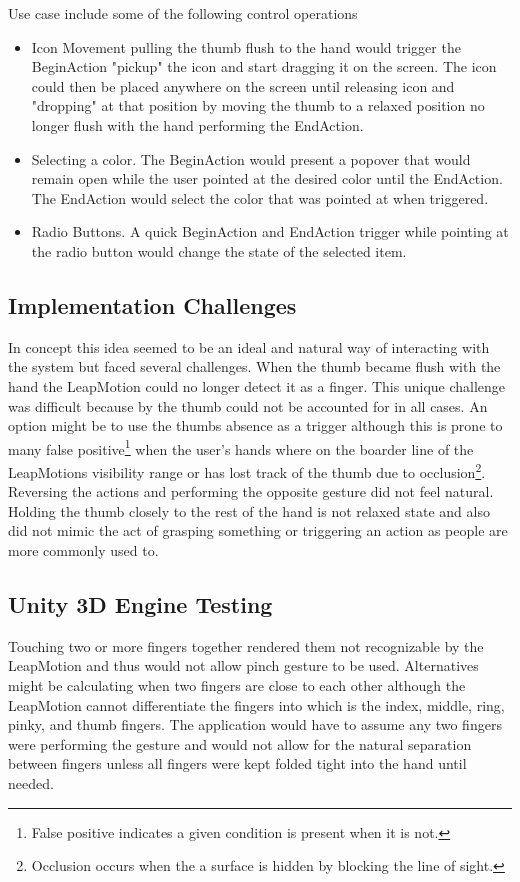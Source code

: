 Use case include some of the following control operations

\begin{itemize}
\item Icon Movement pulling the thumb flush to the hand would trigger the BeginAction "pickup" the icon and start dragging it on the screen. The icon could then be placed anywhere on the screen until releasing icon and "dropping" at that position by moving the thumb to a relaxed position no longer flush with the hand performing the EndAction.
\item Selecting a color. The BeginAction would present a popover that would remain open while the user pointed at the desired color until the EndAction. The EndAction would select the color that was pointed at when triggered. 
\item Radio Buttons. A quick BeginAction and EndAction trigger while pointing at the radio button would change the state of the selected item. 
\end{itemize}

\subsection{Implementation Challenges}
In concept this idea seemed to be an ideal and natural way of interacting with the system but faced several challenges. When the thumb became flush with the hand the LeapMotion could no longer detect it as a finger. This unique challenge was difficult because by the thumb could not be accounted for in all cases. An option might be to use the thumbs absence as a trigger although this is prone to many false positive\footnote{False positive indicates a given condition is present when it is not.} when the user's hands where on the boarder line of the LeapMotions visibility range or has lost track of the thumb due to occlusion\footnote{Occlusion occurs when the a surface is hidden by blocking the line of sight.}. Reversing the actions and performing the opposite gesture did not feel natural. Holding the thumb closely to the rest of the hand is not relaxed state and also did not mimic the act of grasping something or triggering an action as people are more commonly used to. 


\subsection{Unity 3D Engine Testing}
Touching two or more fingers together rendered them not recognizable by the LeapMotion and thus would not allow pinch gesture to be used. Alternatives might be calculating when two fingers are close to each other although the LeapMotion cannot differentiate the fingers into which is the index, middle, ring, pinky, and thumb fingers. The application would have to assume any two fingers were performing the gesture and would not allow for the natural separation between fingers unless all fingers were kept folded tight into the hand until needed. 

